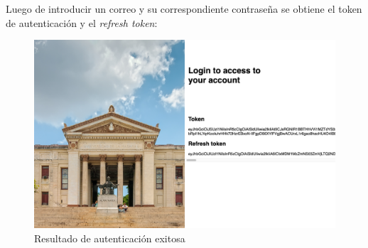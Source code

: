 Luego de introducir un correo y su correspondiente contraseña se obtiene el token de autenticación y el \textit{refresh token}:

\begin{figure}[H]
	\centering
	\includegraphics[width=1\linewidth]{Graphics/interfaz_token_success}
	\caption{Resultado de autenticación exitosa}
	\label{fig:interfaztokensuccess}
\end{figure}